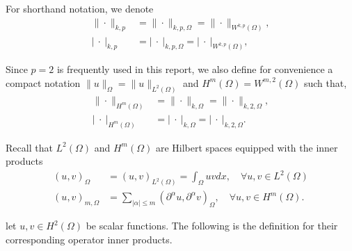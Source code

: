 \documentclass[11pt]{article}
\theoremstyle{remark}
\newcommand{\abs}[1]{\left\lvert #1 \right\rvert}
\renewcommand{\le}{\leqslant}
\numberwithin{equation}{section}
\begin{document}
For shorthand notation, we denote
\begin{equation}
    \begin{split}
\| \cdot \|_{k,p}^{  } & = \| \cdot  \|_{k,p,\Omega   }^{  } = \| \cdot  \|_{ W^{k,p}( \Omega )   }^{  }, \\
   \abs{ \  \cdot \ }_{k,p}^{  } &= \abs{ \   \cdot \ }_{k,p,\Omega   }^{  } = \abs{ \  \cdot \ }_{ W^{k,p}( \Omega )   }^{  },
    \end{split}
\end{equation}

Since $p=2$ is frequently used in this report, we also define for convenience a compact notation $\| u \|_{ \Omega  }^{  }  = \| u \|_{ L^{2}\left( \Omega  \right)  }^{  } $ and $H^{m}( \Omega ) = W^{m,2}( \Omega )  $ such that,
\begin{equation}
\begin{split}
\| \cdot  \|_{H^{m}( \Omega )   }^{  } & = \|   \cdot  \|_{k,\Omega   }^{  } = \|   \cdot  \|_{k,2,\Omega   }^{  },  \\
\abs{ \   \cdot \  }_{H^{m}( \Omega )   }^{  } & = \abs{ \   \cdot \  } _{k,\Omega   }^{  } =  \abs{ \ \cdot \   } _{k,2,\Omega   }^{  }.
\end{split}
\end{equation}

Recall that $L^{2}( \Omega ) $ and $H^{m}( \Omega ) $ are Hilbert spaces equipped with the inner products
\begin{equation}
    \begin{split}
\left( u,v \right) _{\Omega } & = \left( u,v \right) _{L^2\left( \Omega  \right) } = \int_{\Omega }^{} u  v dx, \quad \forall u,v \in L^{2}( \Omega )  \\
    \left( u,v \right) _{m,\Omega } & = \sum_{\left\lvert \alpha  \right\rvert  \le  m}^{}  ( \partial ^{\alpha } u ,  \partial ^{\alpha } v )_{\Omega }, \quad  \forall u,v \in H^{m}( \Omega  ).
    \end{split}
\end{equation}

 let $u,v \in H^{2}(\Omega)$ be scalar functions. The following is the definition for their corresponding operator inner products.
\end{document}
